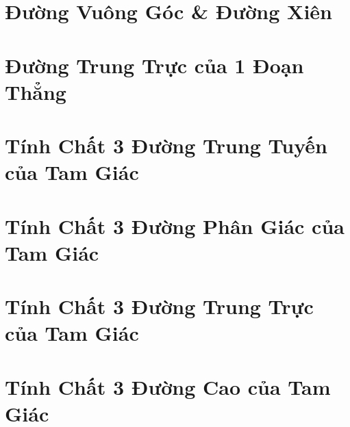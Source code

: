 \documentclass{article}
\begin{document}

\section{Đường Vuông Góc \& Đường Xiên}


\section{Đường Trung Trực của 1 Đoạn Thẳng}


\section{Tính Chất 3 Đường Trung Tuyến của Tam Giác}


\section{Tính Chất 3 Đường Phân Giác của Tam Giác}


\section{Tính Chất 3 Đường Trung Trực của Tam Giác}


\section{Tính Chất 3 Đường Cao của Tam Giác}


\printbibliography[heading=bibintoc]
	
\end{document}
